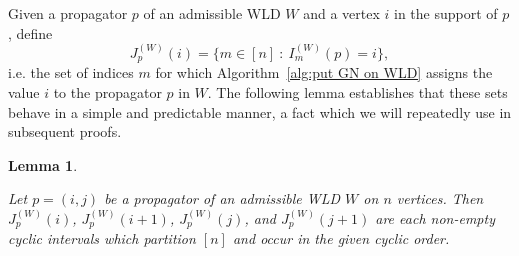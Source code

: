 \documentclass[11pt]{article}
\newtheorem{lem}[thm]{Lemma}
\theoremstyle{remark}
\theoremstyle{definition}
\begin{document}
%


Given a propagator $p$ of an admissible WLD $W$ and a vertex $i$ in the support of $p$, define
\[J_p^{(W)}(i) = \{m \in [n] \ : \ I^{(W)}_m(p) = i \},\]
i.e. the set of indices $m$ for which Algorithm~\ref{alg:put GN on WLD} assigns the value $i$ to the propagator $p$ in $W$. The following lemma establishes that these sets behave in a simple and predictable manner, a fact which we will repeatedly use in subsequent proofs.

\begin{lem} \label{vertex cyclic int lem}
  
Let $p=(i,j)$ be a propagator of an admissible WLD $W$ on $n$ vertices.  Then $J_p^{(W)}(i)$, $J_p^{(W)}(i+1)$, $J_p^{(W)}(j)$, and $J_p^{(W)}(j+1)$ are each non-empty cyclic intervals which partition $[n]$ and occur in the given cyclic order.
\end{lem}
\end{document}
